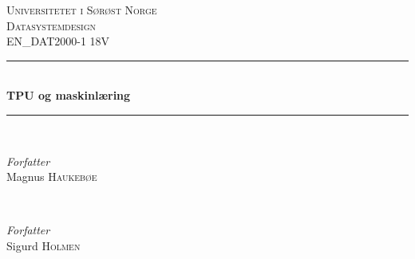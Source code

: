 \begin{titlepage} %
	\newcommand{\HRule}{\rule{\linewidth}{0.5mm}} %
	
	\center %
	
	
	\textsc{\LARGE Universitetet i Sørøst Norge}\\[1.5cm] %
	
	\textsc{\Large Datasystemdesign}\\[0.5cm] %
	
	\textsc{\large EN\_DAT2000-1 18V}\\[0.5cm] %
	
	
	\HRule\\[0.4cm]
	
	{\huge\bfseries TPU og maskinlæring}\\[0.4cm] %
	
	\HRule\\[1.5cm]
	
	
	\begin{minipage}{0.4\textwidth}
		\begin{flushleft}
			\large
			\textit{Forfatter}\\
			Magnus \textsc{Haukebøe} %
		\end{flushleft}
	\end{minipage}
	~
	\begin{minipage}{0.4\textwidth}
		\begin{flushright}
			\large
			\textit{Forfatter}\\
			Sigurd \textsc{Holmen} %
		\end{flushright}
	\end{minipage}

	

\end{titlepage}
